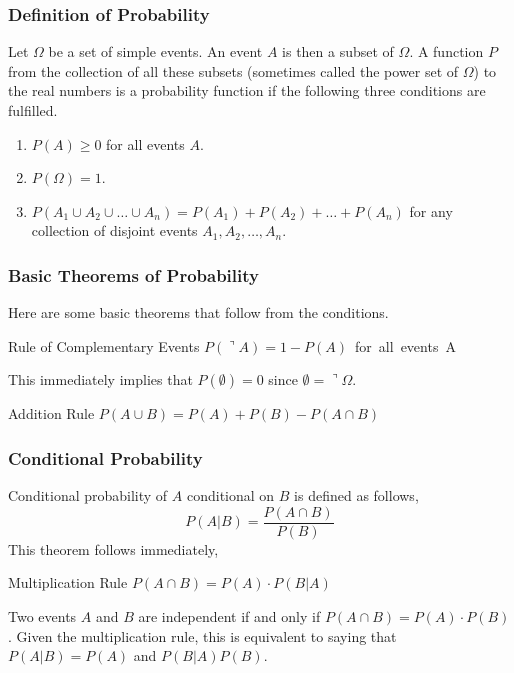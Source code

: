 \documentclass[xcolor=dvipsnames]{beamer}
\begin{document}
\begin{frame}
  \frametitle{Definition of Probability}
Let $\Omega$ be a set of simple events. An event $A$ is then a subset
of $\Omega$. A function $P$ from the collection of all these subsets
(sometimes called the power set of $\Omega$) to the real numbers is a
\alert{probability function} if the following three conditions are
fulfilled.
\begin{enumerate}
\item<1-> $P(A)\geq{}0$ for all events $A$.
\item<2-> $P(\Omega)=1$.
\item<3->
  $P(A_{1}\cup{}A_{2}\cup\ldots\cup{}A_{n})=P(A_{1})+P(A_{2})+\ldots{}+P(A_{n})$
  for any collection of disjoint events $A_{1},A_{2},\ldots,A_{n}$.
\end{enumerate}
\end{frame}

\begin{frame}
  \frametitle{Basic Theorems of Probability}
Here are some basic theorems that follow from the conditions.
\begin{block}{Rule of Complementary Events}
  $P(\urcorner{}A)=1-P(A)$\mbox{ for all events }A
\end{block}
This immediately implies that $P(\emptyset)=0$ since
$\emptyset=\urcorner\Omega$.
\begin{block}{Addition Rule}
  $P(A\cup{}B)=P(A)+P(B)-P(A\cap{}B)$
\end{block}
\end{frame}

\begin{frame}
  \frametitle{Conditional Probability}
Conditional probability of $A$ conditional on $B$ is defined as follows,
\begin{equation}
  \label{eq:iekeengi}
  P(A|B)=\frac{P(A\cap{}B)}{P(B)}
\end{equation}
This theorem follows immediately,
\begin{block}{Multiplication Rule}
  $P(A\cap{}B)=P(A)\cdot{}P(B|A)$
\end{block}
Two events $A$ and $B$ are \alert{independent} if and only if
$P(A\cap{}B)=P(A)\cdot{}P(B)$. Given the multiplication rule, this is
equivalent to saying that $P(A|B)=P(A)$ and $P(B|A)P(B)$.
\end{frame}
\end{document}
